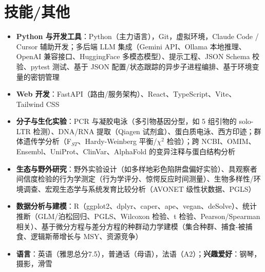 \documentclass{my-resume}
\begin{document}
\section{技能/其他}
\entrySkillsSep
\begin{itemize}[parsep=0.2ex]
  \item \textbf{Python 与开发工具}：Python（主力语言），Git，虚拟环境，Claude Code / Cursor 辅助开发；多后端 LLM 集成（Gemini API、Ollama 本地推理、OpenAI 兼容接口、HuggingFace 多模态模型）、提示工程、JSON Schema 校验、pytest 测试、基于 JSON 配置/状态跟踪的异步子进程编排、基于环境变量的密钥管理
  \item \textbf{Web 开发}：FastAPI（路由/服务架构）、React、TypeScript、Vite、Tailwind CSS
  \item \textbf{分子与生化实验}：PCR 与凝胶电泳（多引物基因分型，如 5 组引物的 solo-LTR 检测）、DNA/RNA 提取（Qiagen 试剂盒）、蛋白质电泳、西方印迹；群体遗传学分析（F$_{ST}$、Hardy-Weinberg 平衡/$\chi^2$ 检验）；跨 NCBI、OMIM、Ensembl、UniProt、ClinVar、AlphaFold 的变异注释与蛋白结构分析
  \item \textbf{生态与野外研究}：野外实验设计（如多样地彩色陷阱盘偏好实验）、具观察者间信度检验的行为学测定（行为学评分、惊愕反应时间测量）、生物多样性/环境调查、宏观生态学与系统发育比较分析（AVONET 级性状数据、PGLS）
  \item \textbf{数据分析与建模}：R（ggplot2、dplyr、caper、ape、vegan、deSolve）、统计推断（GLM/泊松回归、PGLS、Wilcoxon 检验、t 检验、Pearson/Spearman 相关）、基于微分方程与差分方程的种群动力学建模（集合种群、捕食-被捕食、逻辑斯蒂增长与 MSY、资源竞争）
  \item \textbf{语言}：英语（雅思总分7.5），普通话（母语），法语（A2）；\textbf{兴趣爱好}：钢琴，摄影，滑雪
\end{itemize}
\end{document}
